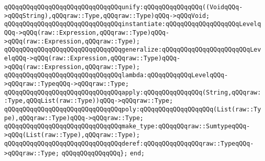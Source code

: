 \verb|qQQqqQQqqQQqqQQqqQQqqQQqqQQqqQQqunify:qQQqqQQqqQQqqQQq((VoidqQQq->qQQqString),qQQqraw::Type,qQQqraw::Type)qQQq->qQQqVoid;|\newline
\verb|qQQqqQQqqQQqqQQqqQQqqQQqqQQqqQQqinstantiate:qQQqqQQqqQQqqQQqqQQqLevelqQQq->qQQq(raw::Expression,qQQqraw::Type)qQQq->qQQq(raw::Expression,qQQqraw::Type);|\newline
\verb|qQQqqQQqqQQqqQQqqQQqqQQqqQQqqQQqgeneralize:qQQqqQQqqQQqqQQqqQQqqQQqLevelqQQq->qQQq(raw::Expression,qQQqraw::Type)qQQq->qQQq(raw::Expression,qQQqraw::Type);|\newline
\verb|qQQqqQQqqQQqqQQqqQQqqQQqqQQqqQQqlambda:qQQqqQQqqQQqLevelqQQq->qQQqraw::TypeqQQq->qQQqraw::Type;|\newline
\verb|qQQqqQQqqQQqqQQqqQQqqQQqqQQqqQQqapply:qQQqqQQqqQQqqQQq(String,qQQqraw::Type,qQQqList(raw::Type))qQQq->qQQqraw::Type;|\newline
\verb|qQQqqQQqqQQqqQQqqQQqqQQqqQQqqQQqpoly:qQQqqQQqqQQqqQQqqQQq(List(raw::Type),qQQqraw::Type)qQQq->qQQqraw::Type;|\newline
\verb|qQQqqQQqqQQqqQQqqQQqqQQqqQQqqQQqmake_type:qQQqqQQqraw::SumtypeqQQq->qQQq(List(raw::Type),qQQqraw::Type);|\newline
\verb|qQQqqQQqqQQqqQQqqQQqqQQqqQQqqQQqderef:qQQqqQQqqQQqqQQqraw::TypeqQQq->qQQqraw::Type;|\newline
\verb|qQQqqQQqqQQqqQQq};|\newline
\verb|end;|\newline

